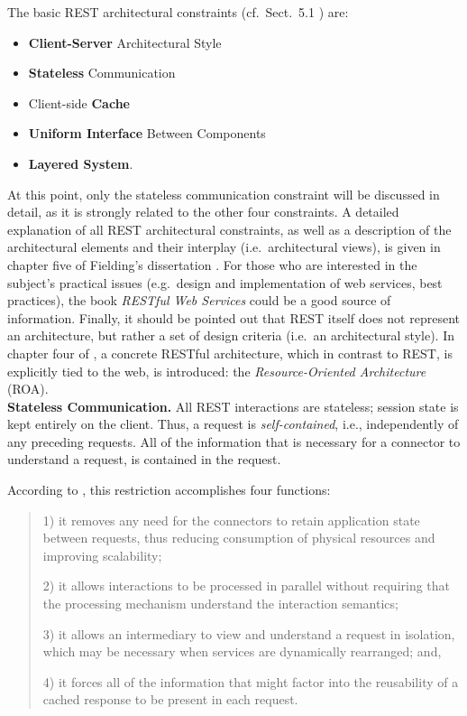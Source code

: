 The basic REST architectural constraints (cf.\ Sect.~5.1 \cite{Fie00}) are:
\begin{itemize}
	\item {\bf Client-Server} Architectural Style
	\item {\bf Stateless} Communication
	\item Client-side {\bf Cache}
	\item {\bf Uniform Interface} Between Components
	\item {\bf Layered System}.
\end{itemize}

At this point, only the stateless communication constraint will be discussed in detail, as it is strongly related to the other four constraints. A detailed explanation of all REST architectural constraints, as well as a description of the architectural elements and their interplay (i.e.\ architectural views), is given in chapter five of Fielding's dissertation \cite[p.~76ff]{Fie00}. For those who are interested in the subject's practical issues (e.g.\ design and implementation of web services, best practices), the book \emph{RESTful Web Services} \cite{RR07} could be a good source of information. Finally, it should be pointed out that REST itself does not represent an architecture, but rather a set of design criteria (i.e.\ an architectural style). In chapter four of \cite{RR07}, a concrete RESTful architecture, which in contrast to REST, is explicitly tied to the web, is introduced: the \emph{Resource-Oriented Architecture} (ROA).\\

\noindent
{\bf Stateless Communication.}
All REST interactions are stateless; session state is kept entirely on the client. Thus, a request is \emph{self-contained}, i.e., independently of any preceding requests. All of the information that is necessary for a connector to understand a request, is contained in the request.

According to \cite[p.~93]{Fie00}, this restriction accomplishes four functions:
\begin{quote}
1) it removes any need for the connectors to retain application state between requests, thus reducing consumption of physical resources and improving scalability;

2) it allows interactions to be processed in parallel without requiring that the processing mechanism understand the interaction semantics;

3) it allows an intermediary to view and understand a request in isolation, which may be necessary when services are dynamically rearranged; and,

4) it forces all of the information that might factor into the reusability of a cached response to be present in each request.
\end{quote}

